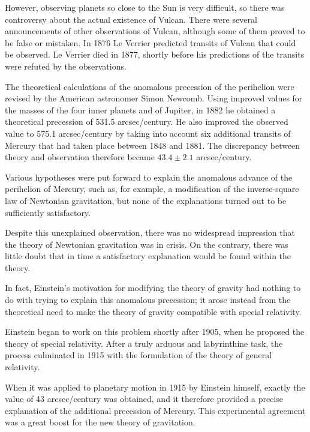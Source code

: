 \begin{points}
\item However, observing planets so close to the Sun is very difficult, so there was controversy about the actual existence of Vulcan. There were several announcements of other observations of Vulcan, although some of them proved to be false or mistaken. In 1876 Le Verrier predicted transits of Vulcan that could be observed. Le Verrier died in 1877, shortly before his predictions of the transits were refuted by the observations.

\item The theoretical calculations of the anomalous precession of the perihelion were revised by the American astronomer Simon Newcomb. Using improved values for the masses of the four inner planets and of Jupiter, in 1882 he obtained a theoretical precession of 531.5 arcsec/century. He also improved the observed value to 575.1 arcsec/century by taking into account six additional transits of Mercury that had taken place between 1848 and 1881. The discrepancy between theory and observation therefore became $43.4\pm2.1$ arcsec/century.

\item Various hypotheses were put forward to explain the anomalous advance of the perihelion of Mercury, such as, for example, a modification of the inverse-square law of Newtonian gravitation, but none of the explanations turned out to be sufficiently satisfactory.

\item Despite this unexplained observation, there was no widespread impression that the theory of Newtonian gravitation was in crisis. On the contrary, there was little doubt that in time a satisfactory explanation would be found within the theory.

\item In fact, Einstein's motivation for modifying the theory of gravity had nothing to do with trying to explain this anomalous precession; it arose instead from the theoretical need to make the theory of gravity compatible with special relativity.

\item Einstein began to work on this problem shortly after 1905, when he proposed the theory of special relativity. After a truly arduous and labyrinthine task, the process culminated in 1915 with the formulation of the theory of general relativity.

\item When it was applied to planetary motion in 1915 by Einstein himself, exactly the value of 43 arcsec/century was obtained, and it therefore provided a precise explanation of the additional precession of Mercury. This experimental agreement was a great boost for the new theory of gravitation.
\end{points}

